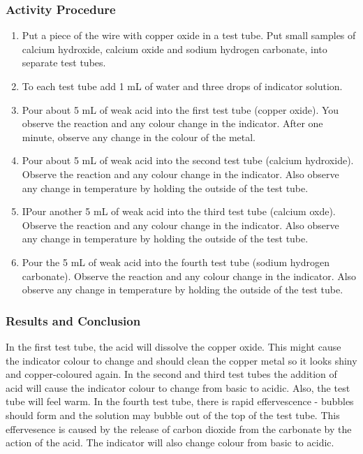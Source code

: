 \subsubsection*{Activity Procedure}
\begin{enumerate}
\item{Put a piece of the wire with copper oxide in a test tube. Put small samples of calcium hydroxide, calcium oxide and sodium hydrogen carbonate, into separate test tubes.}
\item{To each test tube add 1 mL of water and three drops of indicator solution.}
\item{Pour about 5 mL of weak acid into the first test tube (copper oxide). You observe the reaction and any colour change in the indicator. After one minute, observe any change in the colour of the metal.}
\item{Pour about 5 mL of weak acid into the second test tube (calcium hydroxide). Observe the reaction and any colour change in the indicator. Also observe any change in temperature by holding the outside of the test tube.}
\item{IPour another 5 mL of  weak acid into the third test tube (calcium oxde). Observe the reaction and any colour change in the indicator. Also observe any change in temperature by holding the outside of the test tube.}
\item{Pour the 5 mL of weak acid into the fourth test tube (sodium hydrogen carbonate). Observe the reaction and any colour change in the indicator. Also observe any change in temperature by holding the outside of the test tube.}
\end{enumerate}

\subsubsection*{Results and Conclusion}
In the first test tube, the acid will dissolve the copper oxide. This might cause the indicator colour to change and should clean the copper metal so it looks shiny and copper-coloured again.
In the second and third test tubes the addition of acid will cause the indicator colour to change from basic to acidic. Also, the test tube will feel warm.
In the fourth test tube, there is rapid effervescence - bubbles should form and the solution may bubble out of the top of the test tube. This effervesence is caused by the release of carbon dioxide from the carbonate by the action of the acid. The indicator will also change colour from basic to acidic.

